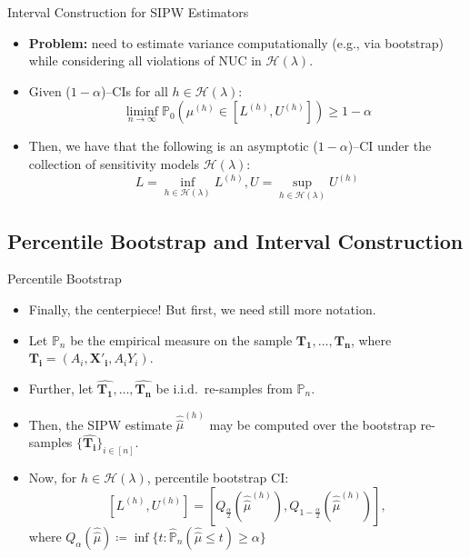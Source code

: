 \documentclass{beamer}
\newcommand{\pr}{\mathbb{P}}
\begin{document}
\begin{frame}{Interval Construction for SIPW Estimators}

\begin{itemize}
  \itemsep12pt
  \item \textbf{Problem:} need to estimate variance computationally (e.g., via
    bootstrap) while considering all violations of NUC in
    $\mathcal{H}(\lambda)$.
  \item Given ($1-\alpha$)--CIs for all $h \in \mathcal{H}(\lambda)$:
    \[
      \liminf\limits_{n \rightarrow \infty} \pr_0(\mu^{(h)} \in [L^{(h)},
      U^{(h)}]) \geq 1 - \alpha
    \]
  \item Then, we have that the following is an asymptotic ($1-\alpha$)--CI under
    the collection of sensitivity models $\mathcal{H}(\lambda)$:
    \[
      L = \inf_{h \in \mathcal{H}(\lambda)}L^{(h)}, U = \sup_{h \in
        \mathcal{H}(\lambda)}U^{(h)}
    \]
\end{itemize}

\end{frame}

\subsection{Percentile Bootstrap and Interval Construction}

\begin{frame}{Percentile Bootstrap}

\begin{itemize}
  \itemsep12pt
  \item Finally, the centerpiece! But first, we need still more notation.
  \item Let $\pr_n$ be the empirical measure on the sample $\bm{T_1}, \ldots,
    \bm{T_n}$, where $\bm{T_i} = (A_i, \bm{X'_{i}}, A_i Y_i)$.
  \item Further, let $\bm{\hat{T_1}}, \ldots, \bm{\hat{T_n}}$ be
    i.i.d.~re-samples from $\pr_n$.
  \item Then, the SIPW estimate $\hat{\hat{\mu}}^{(h)}$ may be computed over the
    bootstrap re-samples $\{\bm{\hat{T_i}}\}_{i \in [n]}$.
  \item Now, for $h \in \mathcal{H}(\lambda)$, percentile bootstrap CI:
    \[
      [L^{(h)}, U^{(h)}] = \left[Q_{\frac{\alpha}{2}}(\hat{\hat{\mu}}^{(h)}),
      Q_{1 - \frac{\alpha}{2}}(\hat{\hat{\mu}}^{(h)})\right],
    \]
    where $Q_{\alpha}(\hat{\hat{\mu}}) \coloneqq \inf\{t:
    \hat{\pr}_n(\hat{\hat{\mu}} \leq t) \geq \alpha\}$
\end{itemize}

\end{frame}
\end{document}
